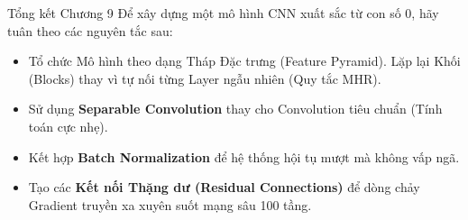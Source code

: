 \documentclass[aspectratio=169]{beamer}
\begin{document}
\begin{frame}{Tổng kết Chương 9}
    Để xây dựng một mô hình CNN xuất sắc từ con số 0, hãy tuân theo các nguyên tắc sau:
    \begin{itemize}
        \item Tổ chức Mô hình theo dạng Tháp Đặc trưng (Feature Pyramid). Lặp lại Khối (Blocks) thay vì tự nối từng Layer ngẫu nhiên (Quy tắc MHR).
        \item Sử dụng \textbf{Separable Convolution} thay cho Convolution tiêu chuẩn (Tính toán cực nhẹ).
        \item Kết hợp \textbf{Batch Normalization} để hệ thống hội tụ mượt mà không vấp ngã.
        \item Tạo các \textbf{Kết nối Thặng dư (Residual Connections)} để dòng chảy Gradient truyền xa xuyên suốt mạng sâu 100 tầng.
    \end{itemize}
\end{frame}
\end{document}
